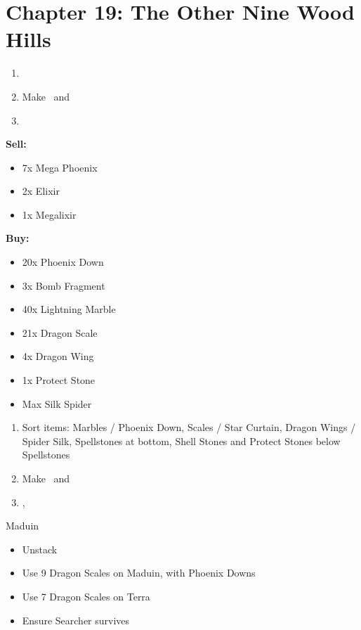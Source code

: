 \chapter{Chapter 19: The Other Nine Wood Hills}
\begin{enumerate}
    \item \cs\
    \item Make \lann\ and \reynn\ \bigc\
    \item {}
\end{enumerate}
\begin{shop}
\textbf{Sell:}
    \begin{itemize}
        \item 7x Mega Phoenix
        \item 2x Elixir
        \item 1x Megalixir
    \end{itemize}
\textbf{Buy:}
    \begin{itemize}
        \item 20x Phoenix Down
        \item 3x Bomb Fragment
        \item 40x Lightning Marble
        \item 21x Dragon Scale
        \item 4x Dragon Wing
        \item 1x Protect Stone
        \item Max Silk Spider
    \end{itemize}
\end{shop}
\begin{enumerate}[resume]
    \item Sort items: Marbles / Phoenix Down, Scales / Star Curtain, Dragon Wings / Spider Silk, Spellstones at bottom, Shell Stones and Protect Stones below Spellstones
    \item Make \lann\ and \reynn\ \smallc\
    \item {}, \cs\
\end{enumerate}
\begin{battle}[]{Maduin}
    \begin{itemize}
        \item Unstack
        \item Use 9 Dragon Scales on Maduin, with Phoenix Downs
        \item Use 7 Dragon Scales on Terra
        \item Ensure Searcher survives
    \end{itemize}
\end{battle}
